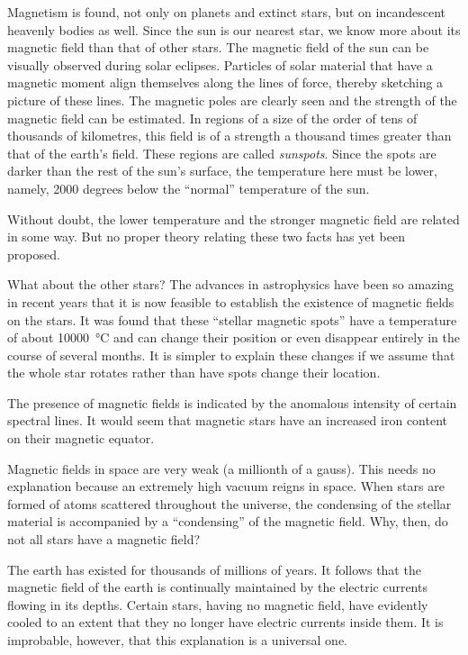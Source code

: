 Magnetism is found, not only on planets and extinct stars, but on incandescent heavenly bodies as well. Since the sun is our nearest star, we know more about its magnetic field than that of other stars. The magnetic field of the sun can be visually observed during solar eclipses. Particles of solar material that have a magnetic moment align themselves along the lines of force, thereby sketching a picture of these lines. The magnetic poles are clearly seen and the strength of the magnetic field can be estimated. In regions of a size of the order of tens of thousands of kilometres, this field is of a strength a thousand times greater than that of the earth's field. These regions are called \emph{sunspots}. Since the spots are darker than the rest of the sun's surface, the temperature here must be lower, namely, 2000 degrees below the ``normal'' temperature of the sun.

Without doubt, the lower temperature and the stronger magnetic field are related in some way. But no proper theory relating these two facts has yet been proposed.

What about the other stars? The advances in astrophysics have been so amazing in recent years that it is now feasible to establish the existence of magnetic fields on the stars. It was found that these ``stellar magnetic spots'' have a temperature of about \SI{10000}{\celsius} and can change their position or even disappear entirely in the course of several months. It is simpler to explain these changes if we assume that the whole star rotates rather than have spots change their location.

The presence of magnetic fields is indicated by the anomalous intensity of certain spectral lines. It would seem that magnetic stars have an increased iron content on their magnetic equator.

Magnetic fields in space are very weak (a millionth of a gauss). This needs no explanation because an extremely high vacuum reigns in space. When stars are formed of atoms scattered throughout the universe, the condensing of the stellar material is accompanied by a ``condensing'' of the magnetic field. Why, then, do not all stars have a magnetic field?

The earth has existed for thousands of millions of years. It follows that the magnetic field of the earth is continually maintained by the electric currents flowing in its depths. Certain stars, having no magnetic field, have evidently cooled to an extent that they no longer have electric currents inside them. It is improbable, however, that this explanation is a universal one.
